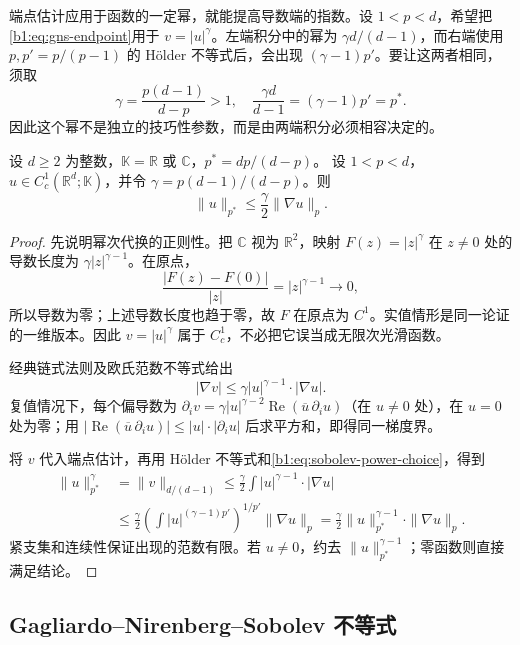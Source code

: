 \ProseParagraphBreak

端点估计应用于函数的一定幂，就能提高导数端的指数。设 \(1<p<d\)，希望把\eqref{b1:eq:gns-endpoint}用于 \(v=|u|^\gamma\)。左端积分中的幂为 \(\gamma d/(d-1)\)，而右端使用 \(p,p'=p/(p-1)\) 的 Hölder 不等式后，会出现 \((\gamma-1)p'\)。要让这两者相同，须取
\begin{equation}\label{b1:eq:sobolev-power-choice}
 \gamma=\frac{p(d-1)}{d-p}>1,\quad
 \frac{\gamma d}{d-1}=(\gamma-1)p'=p^*.
\end{equation}
因此这个幂不是独立的技巧性参数，而是由两端积分必须相容决定的。

\begin{lemma}\label{b1:lem:gns-power-estimate}
设 \(d\geq2\) 为整数，\(\mathbb K=\mathbb R\) 或 \(\mathbb C\)，\(p^*=dp/(d-p)\)。
设 \(1<p<d\)，\(u\in C_c^1(\mathbb R^d;\mathbb K)\)，并令 \(\gamma=p(d-1)/(d-p)\)。则
\[
 \|u\|_{p^*}\leq\frac{\gamma}{2}\|\nabla u\|_p.
\]
\end{lemma}
\begin{proof}
先说明幂次代换的正则性。把 \(\mathbb C\) 视为 \(\mathbb R^2\)，映射 \(F(z)=|z|^\gamma\) 在 \(z\ne0\) 处的导数长度为 \(\gamma|z|^{\gamma-1}\)。在原点，
\[
 \frac{|F(z)-F(0)|}{|z|}=|z|^{\gamma-1}\longrightarrow0,
\]
所以导数为零；上述导数长度也趋于零，故 \(F\) 在原点为 \(C^1\)。实值情形是同一论证的一维版本。因此 \(v=|u|^\gamma\) 属于 \(C_c^1\)，不必把它误当成无限次光滑函数。

经典链式法则及欧氏范数不等式给出
\[
 |\nabla v|\leq\gamma|u|^{\gamma-1}\cdot|\nabla u|.
\]
复值情况下，每个偏导数为
\(\partial_i v=\gamma|u|^{\gamma-2}\operatorname{Re}
(\overline u\,\partial_i u)\)（在 \(u\ne0\) 处），在 \(u=0\) 处为零；用
\(\bigl|\operatorname{Re}(\overline u\,\partial_i u)\bigr|
\leq|u|\cdot|\partial_i u|\) 后求平方和，即得同一梯度界。

将 \(v\) 代入端点估计，再用 Hölder 不等式和\eqref{b1:eq:sobolev-power-choice}，得到
\[
 \begin{aligned}
 \|u\|_{p^*}^{\gamma}
 &=\|v\|_{d/(d-1)}
 \leq\frac{\gamma}{2}
          \int |u|^{\gamma-1}\cdot|\nabla u|\\
 &\leq\frac{\gamma}{2}
       \left(\int|u|^{(\gamma-1)p'}\right)^{1/p'}
       \|\nabla u\|_p
 =\frac{\gamma}{2}\|u\|_{p^*}^{\gamma-1}
                  \cdot\|\nabla u\|_p.
 \end{aligned}
\]
紧支集和连续性保证出现的范数有限。若 \(u\ne0\)，约去
\(\|u\|_{p^*}^{\gamma-1}\)；零函数则直接满足结论。
\end{proof}

\subsection{Gagliardo–Nirenberg–Sobolev 不等式}
\label{b1:subsec:240203}

